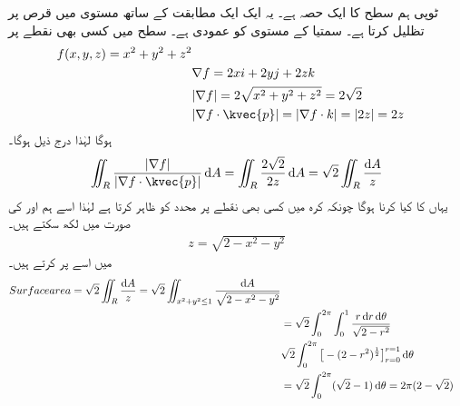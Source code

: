 ٹوپی  ہم سطح 
کا ایک حصہ ہے۔ یہ ایک ایک مطابقت کے ساتھ مستوی 
 میں قرص 
پر تظلیل کرتا ہے۔ سمتیا 
کے مستوی کو عمودی ہے۔ سطح میں کسی بھی نقطے پر 
\begin{align}
f (x, y, z) = x^2 + y^2 + z^2 \\
& \nabla f = 2x i + 2y j + 2 z k \\
& |\nabla f| = 2 \sqrt{x^2 + y^2 + z^2} = 2 \sqrt{2} \\
& |\nabla f \cdot \kvec{p}| = |\nabla f \cdot k| = |2 z| = 2 z
\end{align}
ہوگا لہٰذا درج ذیل ہوگا۔ 
\begin{align}
\iint_R \frac{|\nabla f|}{|\nabla f \cdot \kvec{p}|} \dif A = \iint_R \frac{2 \sqrt{2}}{2 z} \dif A = \sqrt{2} \iint_R \frac{\dif A}{z}
\end{align} 
یہاں  کا کیا کرنا ہوگا چونکہ کرہ میں کسی بھی نقطے پر 
محدد کو 
ظاہر کرتا ہے لہٰذا اسے ہم  اور  کی صورت میں لکھ سکتے ہیں۔ 
\begin{align}
z = \sqrt{2 - x^2 - y^2}
\end{align} 
 میں اسے پر کرتے ہیں۔
\begin{align}
Surface area = \sqrt{2} \iint_R \frac{\dif A}{z} = \sqrt{2} \iint_{x^2 + y^2 \le 1} \frac{\dif A}{\sqrt{2 - x^2 - y^2}} \\
& = \sqrt{2} \int^{2 \pi}_0 \int^1_0 \frac{r \dif r \dif \theta}{\sqrt{2 - r^2}} \\
& \sqrt{2} \int^{2 \pi}_0 \big[ -(2 - r^2)^{\frac{1}{2}} \big]^{r = 1}_{r = 0} \dif \theta \\
& = \sqrt{2} \int^{2 \pi}_0 (\sqrt{2} - 1) \dif \theta = 2 \pi (2 - \sqrt{2})
\end{align}

